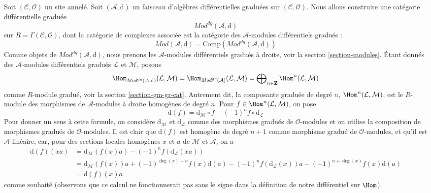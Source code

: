 \medskip\noindent
Soit $(\mathcal{C}, \mathcal{O})$ un site annelé.
Soit $(\mathcal{A}, \text{d})$ un faisceau d'algèbres différentielles graduées sur $(\mathcal{C}, \mathcal{O})$.
Nous allons construire une catégorie différentielle graduée
$$
\textit{Mod}^{dg}(\mathcal{A}, \text{d})
$$
sur $R = \Gamma(\mathcal{C}, \mathcal{O})$, dont la catégorie de complexes associée est la catégorie des $\mathcal{A}$-modules différentiels gradués :
$$
\textit{Mod}(\mathcal{A}, \text{d}) =
\text{Comp}(\textit{Mod}^{dg}(\mathcal{A}, \text{d}))
$$
Comme objets de $\textit{Mod}^{dg}(\mathcal{A}, \text{d})$, nous prenons les $\mathcal{A}$-modules différentiels gradués à droite, voir la section \ref{section-modules}.
Étant donnés des $\mathcal{A}$-modules différentiels gradués $\mathcal{L}$ et $\mathcal{M}$, posons
$$
\Hom_{\textit{Mod}^{dg}(\mathcal{A}, \text{d})}(\mathcal{L}, \mathcal{M}) =
\Hom_{\textit{Mod}^{gr}(\mathcal{A})}(\mathcal{L}, \mathcal{M}) =
\bigoplus\nolimits_{n \in \mathbf{Z}} \Hom^n(\mathcal{L}, \mathcal{M})
$$
comme $R$-module gradué, voir la section \ref{section-gm-gr-cat}.
Autrement dit, la composante graduée de degré $n$, $\Hom^n(\mathcal{L}, \mathcal{M})$, est le $R$-module des morphismes de $\mathcal{A}$-modules à droite homogènes de degré $n$.
Pour $f \in \Hom^n(\mathcal{L}, \mathcal{M})$, on pose
$$
\text{d}(f) =
\text{d}_\mathcal{M} \circ f - (-1)^n f \circ \text{d}_\mathcal{L}
$$
Pour donner un sens à cette formule, on considère $\text{d}_\mathcal{M}$ et $\text{d}_\mathcal{L}$ comme des morphismes gradués de $\mathcal{O}$-modules et on utilise la composition de morphismes gradués de $\mathcal{O}$-modules.
Il est clair que $\text{d}(f)$ est homogène de degré $n + 1$ comme morphisme gradué de $\mathcal{O}$-modules, et qu'il est $\mathcal{A}$-linéaire, car, pour des sections locales homogènes $x$ et $a$ de $\mathcal{M}$ et $\mathcal{A}$, on a
\begin{align*}
\text{d}(f)(xa)
& =
\text{d}_\mathcal{M}(f(x) a) - (-1)^n f (\text{d}_\mathcal{L}(xa)) \\
& =
\text{d}_\mathcal{M}(f(x)) a + (-1)^{\deg(x) + n} f(x) \text{d}(a) 
- (-1)^n f(\text{d}_\mathcal{L}(x)) a - (-1)^{n + \deg(x)} f(x) \text{d}(a) \\
& = \text{d}(f)(x) a
\end{align*}
comme souhaité (observons que ce calcul ne fonctionnerait pas sans le signe dans la définition de notre différentiel sur $\Hom$).

